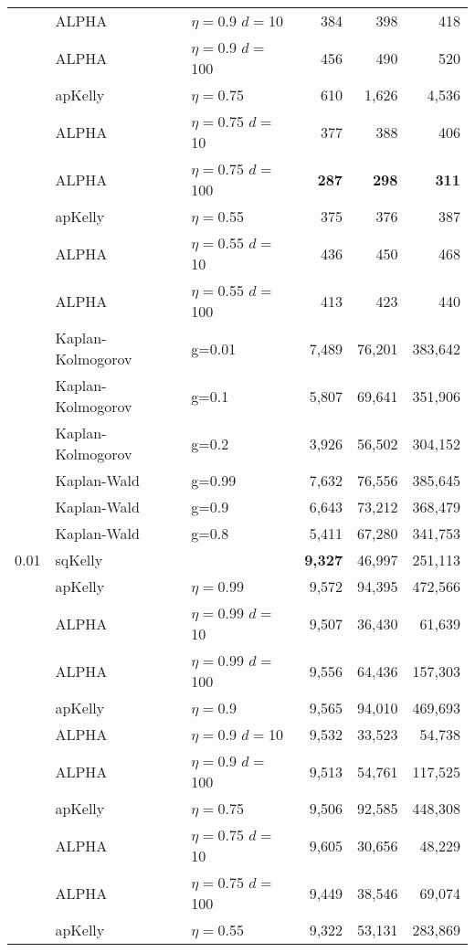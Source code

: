 \documentclass[12pt,runningheads]{llncs}
\begin{document}
{\begin{table}
\begin{tabular}{lll|rrr}
\cline{2-6}
& ALPHA & $\eta=$0.9 $d=$10 & 384  & 398  & 418  \\
& ALPHA & $\eta=$0.9 $d=$100 & 456  & 490  & 520  \\
\cline{2-6} & apKelly & $\eta=$0.75 & 610  & 1,626  & 4,536  \\
\cline{2-6}
& ALPHA & $\eta=$0.75 $d=$10 & 377  & 388  & 406  \\
& ALPHA & $\eta=$0.75 $d=$100 & \bf{287}  & \bf{298}  & \bf{311}  \\
\cline{2-6} & apKelly & $\eta=$0.55 & 375  & 376  & 387  \\
\cline{2-6}
& ALPHA & $\eta=$0.55 $d=$10 & 436  & 450  & 468  \\
& ALPHA & $\eta=$0.55 $d=$100 & 413  & 423  & 440  \\
\cline{2-6}
 & Kaplan-Kolmogorov & g=0.01 & 7,489  & 76,201  & 383,642  \\
 & Kaplan-Kolmogorov & g=0.1 & 5,807  & 69,641  & 351,906  \\
 & Kaplan-Kolmogorov & g=0.2 & 3,926  & 56,502  & 304,152  \\
\cline{2-6}
 & Kaplan-Wald & g=0.99 & 7,632  & 76,556  & 385,645  \\
 & Kaplan-Wald & g=0.9 & 6,643  & 73,212  & 368,479  \\
 & Kaplan-Wald & g=0.8 & 5,411  & 67,280  & 341,753  \\
\hline 0.01 & sqKelly & & \bf{9,327}  & 46,997  & 251,113  \\
\cline{2-6} & apKelly & $\eta=$0.99 & 9,572  & 94,395  & 472,566  \\
\cline{2-6}
& ALPHA & $\eta=$0.99 $d=$10 & 9,507  & 36,430  & 61,639  \\
& ALPHA & $\eta=$0.99 $d=$100 & 9,556  & 64,436  & 157,303  \\
\cline{2-6} & apKelly & $\eta=$0.9 & 9,565  & 94,010  & 469,693  \\
\cline{2-6}
& ALPHA & $\eta=$0.9 $d=$10 & 9,532  & 33,523  & 54,738  \\
& ALPHA & $\eta=$0.9 $d=$100 & 9,513  & 54,761  & 117,525  \\
\cline{2-6} & apKelly & $\eta=$0.75 & 9,506  & 92,585  & 448,308  \\
\cline{2-6}
& ALPHA & $\eta=$0.75 $d=$10 & 9,605  & 30,656  & 48,229  \\
& ALPHA & $\eta=$0.75 $d=$100 & 9,449  & 38,546  & 69,074  \\
\cline{2-6} & apKelly & $\eta=$0.55 & 9,322  & 53,131  & 283,869  \\

\end{tabular}
\end{table}}
\end{document}
